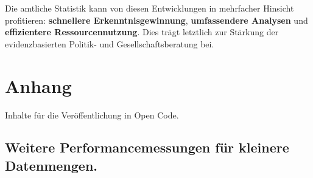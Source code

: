 \documentclass[
  german,
  10pt,
  twoside]{article}
\begin{document}
Die amtliche Statistik kann von diesen Entwicklungen in mehrfacher
Hinsicht profitieren: \textbf{schnellere Erkenntnisgewinnung},
\textbf{umfassendere Analysen} und \textbf{effizientere
Ressourcennutzung}. Dies trägt letztlich zur Stärkung der
evidenzbasierten Politik- und Gesellschaftsberatung bei.

\section*{Anhang}\label{anhang}

Inhalte für die Veröffentlichung in Open Code.

\subsection*{Weitere Performancemessungen für kleinere
Datenmengen.}\label{weitere-performancemessungen-fuxfcr-kleinere-datenmengen.}
\end{document}
